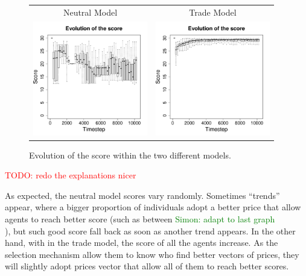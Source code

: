 \documentclass{wscpaperproc}
\newcommand{\memo}[2]{\textcolor{#1}{#2}}
\newcommand{\todo}[1]{\memo{red}{TODO: #1\\}}
\newcommand{\simon}[1]{\memo{green}{Simon: #1\\}}
\begin{document}
\begin{figure}[h]
	\centering
	\begin{tabular}{ c c}
		 Neutral Model & Trade Model \\
		 \includegraphics[width=5cm]{img/ScoreEvolutionForRandom-G2N500.pdf}
		 & \includegraphics[width=5cm]{img/ScoreEvolutionForTrade-G2N500.pdf}

	\end{tabular}
	\caption{Evolution of the score within the two different models.}%
	\label{fig:scoreEvol}
\end{figure}

\todo{redo the explanations nicer} 

As expected, the neutral model scores vary randomly. Sometimes ``trends'' appear, where a bigger proportion of individuals adopt a better price that allow agents to reach better score (such as between \simon{adapt to last graph}), but such good score fall back as soon as another trend appears. In the other hand, with in the trade model, the score of all the agents increase. As the selection mechanism allow them to know who find better vectors of prices, they will slightly adopt prices vector that allow all of them to reach better scores. 
\end{document}

